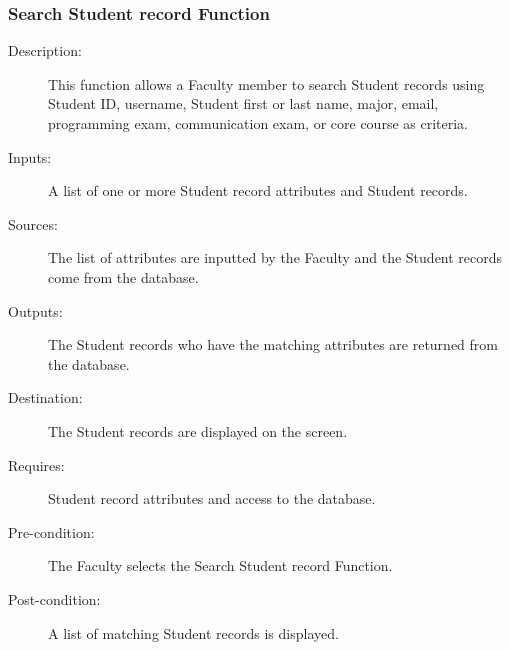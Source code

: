 \subsubsection{\large Search Student record Function} 
\begin{boxed} %
\begin{description}
\item[Description:]
   This function allows a Faculty member to search Student records using
   Student ID, username, Student first or last name, major, email, programming
   exam, communication exam, or core course as criteria.
\item[Inputs:]
   A list of one or more Student record attributes and Student records.
\item[Sources:]
   The list of attributes are inputted by the Faculty and the Student records
   come from the database.
\item[Outputs:]
   The Student records who have the matching attributes are returned from the
   database.
\item[Destination:]
   The Student records are displayed on the screen.
\item[Requires:]
   Student record attributes and access to the database.
\item[Pre-condition:]
   The Faculty selects the Search Student record Function.
\item[Post-condition:]
   A list of matching Student records is displayed.
\end{description}
\end{boxed} %

